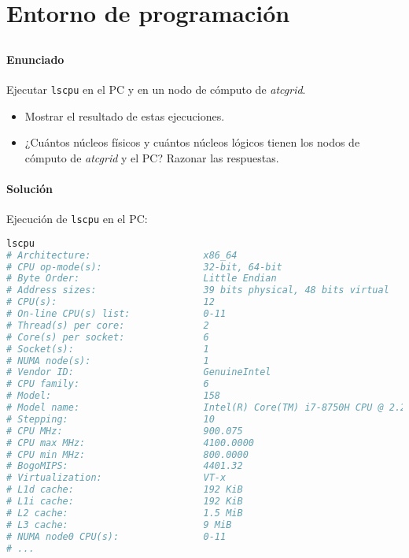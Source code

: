 \chapter{Entorno de programación}\label{entorno-de-programacion}

\section{}\label{ej1-1}

\subsubsection{Enunciado}

Ejecutar \texttt{lscpu} en el PC y en un nodo de cómputo de \textit{atcgrid}.

\begin{itemize}
	\item Mostrar el resultado de estas ejecuciones.
	\item ¿Cuántos núcleos físicos y cuántos núcleos lógicos tienen los nodos de cómputo de \textit{atcgrid} y el PC\@? Razonar las respuestas.
\end{itemize}

\subsubsection{Solución}

Ejecución de \texttt{lscpu} en el PC:

\begin{lstlisting}[language=sh]
lscpu
# Architecture:                    x86_64
# CPU op-mode(s):                  32-bit, 64-bit
# Byte Order:                      Little Endian
# Address sizes:                   39 bits physical, 48 bits virtual
# CPU(s):                          12
# On-line CPU(s) list:             0-11
# Thread(s) per core:              2
# Core(s) per socket:              6
# Socket(s):                       1
# NUMA node(s):                    1
# Vendor ID:                       GenuineIntel
# CPU family:                      6
# Model:                           158
# Model name:                      Intel(R) Core(TM) i7-8750H CPU @ 2.20GHz
# Stepping:                        10
# CPU MHz:                         900.075
# CPU max MHz:                     4100.0000
# CPU min MHz:                     800.0000
# BogoMIPS:                        4401.32
# Virtualization:                  VT-x
# L1d cache:                       192 KiB
# L1i cache:                       192 KiB
# L2 cache:                        1.5 MiB
# L3 cache:                        9 MiB
# NUMA node0 CPU(s):               0-11
# ...
\end{lstlisting}

